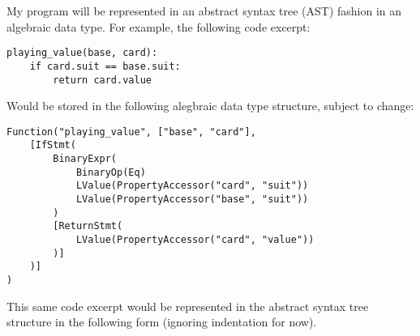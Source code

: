 \documentclass{article}
\begin{document}
My program will be represented in an abstract syntax tree (AST) fashion in an algebraic data type. For example, the following code excerpt:

\begin{lstlisting}[style=fssnake]
playing_value(base, card):
    if card.suit == base.suit:
        return card.value
\end{lstlisting}

Would be stored in the following alegbraic data type structure, subject to change:

\begin{lstlisting}[style=fssnake]
Function("playing_value", ["base", "card"],
    [IfStmt(
        BinaryExpr(
            BinaryOp(Eq)
            LValue(PropertyAccessor("card", "suit"))
            LValue(PropertyAccessor("base", "suit"))
        )
        [ReturnStmt(
            LValue(PropertyAccessor("card", "value"))
        )]
    )]
)
\end{lstlisting}

This same code excerpt would be represented in the abstract syntax tree structure in the following form (ignoring indentation for now).
\end{document}
